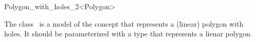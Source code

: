 \ccRefPageBegin

\begin{ccRefClass}{Polygon_with_holes_2<Polygon>}

\ccThreeToTwo

\ccDefinition
The class \ccRefName\ is a model of the 
concept that represents a (linear) polygon with holes. It should be
parameterized with a type  that represents a lienar polygon.

 
\ccIsModel

\end{ccRefClass}
\ccRefPageEnd
